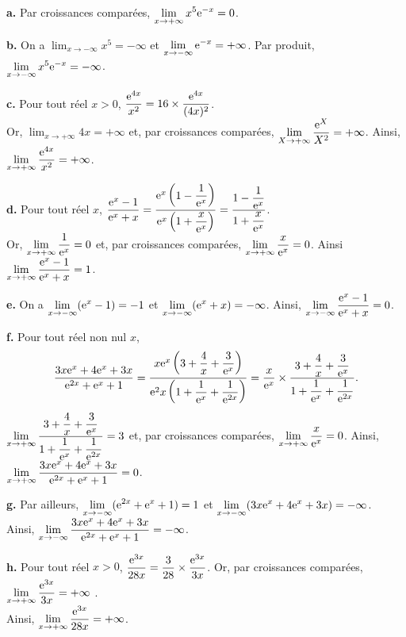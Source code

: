 \documentclass[11pt,fleqn, openany]{book} %
\begin{document}
\begin{solution}  

\textbf{a.} Par croissances comparées, $\displaystyle\lim_{x\to+\infty}x^5\mathrm{e}^{-x}=0$.

\textbf{b.} On a $\displaystyle\lim_{x\to-\infty}x^5 = -\infty$ et $\displaystyle\lim_{x\to -\infty}\mathrm{e}^{-x}=+\infty$.  Par produit, $\displaystyle\lim_{x\to -\infty}x^5\mathrm{e}^{-x}=-\infty$.

\textbf{c.} Pour tout réel $x>0$, $\dfrac{\mathrm{e}^{4x}}{x^2} = 16 \times \dfrac{\mathrm{e}^{4x}}{(4x)^2}$. \\ Or, $\displaystyle\lim_{x\to +\infty}4x=+\infty$ et, par croissances comparées, $\displaystyle\lim_{X \to +\infty} \dfrac{\mathrm{e}^X}{X^2}=+\infty$. Ainsi, $\displaystyle\lim_{x\to+\infty}\dfrac{\mathrm{e}^{4x}}{x^2}=+\infty$.

\textbf{d.} Pour tout réel $x$, $\dfrac{\mathrm{e}^x-1}{\mathrm{e}^x+x}=\dfrac{\mathrm{e}^x\left(1-\dfrac{1}{\mathrm{e}^x}\right)}{\mathrm{e}^x\left(1+\dfrac{x}{\mathrm{e}^x}\right)}=\dfrac{1-\dfrac{1}{\mathrm{e}^x}}{1+\dfrac{x}{\mathrm{e}^x}}$. \\Or, $\displaystyle \lim_{x \to + \infty} \dfrac{1}{\mathrm{e}^x}=0$ et, par croissances comparées, $\displaystyle\lim_{x\to +\infty} \dfrac{x}{\mathrm{e}^x}=0$. Ainsi $\displaystyle \lim_{x \to +\infty} \dfrac{\mathrm{e}^x-1}{\mathrm{e}^x+x}=1$. 

\textbf{e.} On a $\displaystyle\lim_{x\to -\infty} (\mathrm{e}^x-1)=-1$ et $\displaystyle\lim_{x\to-\infty}(\mathrm{e}^x+x)=-\infty$. Ainsi, $\displaystyle \lim_{x \to -\infty} \dfrac{\mathrm{e}^x-1}{\mathrm{e}^x+x}=0$.


\textbf{f.} Pour tout réel non nul $x$, 
\[ \dfrac{3x\mathrm{e}^x+4\mathrm{e}^x+3x}{\mathrm{e}^{2x}+\mathrm{e}^x+1}=\dfrac{x\mathrm{e}^x \left(3+\dfrac{4}{x}+\dfrac{3}{\mathrm{e}^x}\right)}{\mathrm{e}^2x\left(1+\dfrac{1}{\mathrm{e}^x}+\dfrac{1}{\mathrm{e}^{2x}}\right)}=\dfrac{x}{\mathrm{e}^x}\times \dfrac{3+\dfrac{4}{x}+\dfrac{3}{\mathrm{e}^x}}{1+\dfrac{1}{\mathrm{e}^x}+\dfrac{1}{\mathrm{e}^{2x}}}.\]
$\displaystyle \lim_{x \to +\infty} \dfrac{3+\dfrac{4}{x}+\dfrac{3}{\mathrm{e}^x}}{1+\dfrac{1}{\mathrm{e}^x}+\dfrac{1}{\mathrm{e}^{2x}}} = 3$ et, par croissances comparées, $\displaystyle\lim_{x\to +\infty} \dfrac{x}{\mathrm{e}^x}=0$. Ainsi,
$\displaystyle \lim_{x \to +\infty} \dfrac{3x\mathrm{e}^x+4\mathrm{e}^x+3x}{\mathrm{e}^{2x}+\mathrm{e}^x+1}=0$.

\textbf{g.} Par ailleurs, $\displaystyle\lim_{x \to - \infty}(\mathrm{e}^{2x}+\mathrm{e}^x+1)=1$ et $\displaystyle\lim_{x \to - \infty}(3x\mathrm{e}^x+4\mathrm{e}^x+3x)=-\infty$.\\ Ainsi, $\displaystyle \lim_{x \to -\infty} \dfrac{3x\mathrm{e}^x+4\mathrm{e}^x+3x}{\mathrm{e}^{2x}+\mathrm{e}^x+1}=-\infty$.
  
\textbf{h.} Pour tout réel $x>0$, $\dfrac{\mathrm{e}^{3x}}{28x}=\dfrac{3}{28} \times \dfrac{\mathrm{e}^{3x}}{3x}$. Or, par croissances comparées, $\displaystyle\lim _{x\to + \infty} \dfrac{\mathrm{e}^{3x}}{3x}=+\infty$ .\\ Ainsi, $\displaystyle\lim _{x\to + \infty} \dfrac{\mathrm{e}^{3x}}{28x}=+\infty$. 


\end{solution}
\end{document}
